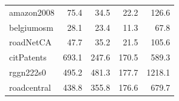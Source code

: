 \begin{table}[tbp]
\begin{center}
{\begin{tabular}{|l|r|r|r|r|}
        \rowcolor{black!10} amazon2008&75.4&34.5&22.2&126.6\\
        \rowcolor{black!2 } belgiumosm&28.1&23.4&11.3&67.8\\
        \rowcolor{black!10} roadNetCA&47.7&35.2&21.5&105.6\\
        \rowcolor{black!2 } citPatents&693.1&247.6&170.5&589.3\\
        \rowcolor{black!10} rggn222s0&495.2&481.3&177.7&1218.1\\
        \rowcolor{black!2 } roadcentral&438.8&355.8&176.6&679.7\\
        \hline
        \end{tabular}
        }
        \label{rq3_table}
    \end{center}
    \end{table}  